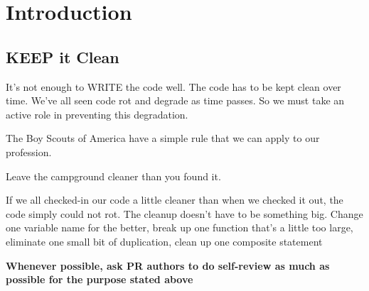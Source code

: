 
\chapter{Introduction}

\section{KEEP it Clean}

It's not enough to WRITE the code well. The code has to be kept clean over time. We've all seen code rot and degrade as time passes. So we must take an active role in preventing this degradation.

The Boy Scouts of America have a simple rule that we can apply to our profession.

\begin{tcolorbox}[colback=green!5!white,colframe=green!75!black]
Leave the campground cleaner than you found it.
\end{tcolorbox}

If we all checked-in our code a little cleaner than when we checked it out, the code
simply could not rot. The cleanup doesn't have to be something big. Change one variable name for the better, break up one function that's a little too large, eliminate one small bit of duplication, clean up one composite  statement

\textbf{Whenever possible, ask PR authors to do self-review as much as possible for the purpose stated above}
